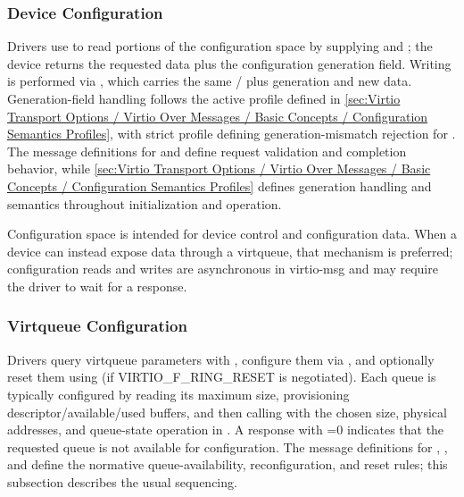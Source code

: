 \subsubsection{Device Configuration}
\label{sec:Virtio Transport Options / Virtio Over Messages / Device Initialization / Device Configuration}

Drivers use  to read portions of the configuration space by
supplying  and ; the device returns the requested
data plus the configuration generation field. Writing is performed via
, which carries the same / plus
generation and new data.
Generation-field handling follows the active profile defined in
\ref{sec:Virtio Transport Options / Virtio Over Messages / Basic Concepts / Configuration Semantics Profiles},
with strict profile defining generation-mismatch rejection for .
The message definitions for  and 
define request validation and completion behavior, while
\ref{sec:Virtio Transport Options / Virtio Over Messages / Basic Concepts / Configuration Semantics Profiles}
defines generation handling and  semantics throughout
initialization and operation.

Configuration space is intended for device control and configuration data.
When a device can instead expose data through a virtqueue, that mechanism is
preferred; configuration reads and writes are asynchronous in virtio-msg and
may require the driver to wait for a response.

\subsubsection{Virtqueue Configuration}
\label{sec:Virtio Transport Options / Virtio Over Messages / Device Initialization / Virtqueue Configuration}

Drivers query virtqueue parameters with , configure them via
, and optionally reset them using  (if
VIRTIO\_F\_RING\_RESET is negotiated). Each queue is typically configured by
reading its maximum size, provisioning descriptor/available/used buffers, and
then calling  with the chosen size, physical addresses, and
queue-state operation in . A  response with
=0 indicates that the requested queue is not available for
configuration. The message definitions for ,
, and  define the normative
queue-availability, reconfiguration, and reset rules; this subsection
describes the usual sequencing.

